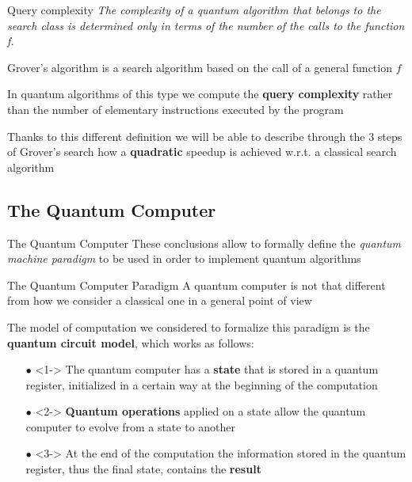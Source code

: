 		\begin{frame}{Query complexity}
			\small
			\emph{The complexity of a quantum algorithm that belongs to the search class is determined only in terms of the number of the calls to the function f.}
			
			\vspace{0.3cm}
			
			Grover's algorithm is a search algorithm based on the call of a general function $f$\\
			
			\vspace{0.2cm}
			
			In quantum algorithms of this type we compute the \textbf{query complexity} rather than the number of elementary instructions executed by the program \\
			
			\vspace{0.2cm}
			
			Thanks to this different definition we will be able to describe through the 3 steps of Grover's search how a \textbf{quadratic} speedup is achieved w.r.t. a classical search algorithm
		\end{frame}
	
	\subsection{The Quantum Computer}
		\begin{frame}{The Quantum Computer}
			\small
			These conclusions allow to formally define the \emph{quantum machine paradigm} to be used in order to implement quantum algorithms
		\end{frame}
	
		\begin{frame}{The Quantum Computer Paradigm}
			A quantum computer is not that different from how we consider a classical one in a general point of view\\
			
			\vspace{0.3cm}
			
			The model of computation we considered to formalize this paradigm is the \textbf{quantum circuit model}, which works as follows:
			\begin{itemize}
				\item[$\bullet$] <1-> The quantum computer has a \textbf{state} that is stored in a quantum register, initialized in a certain way at the beginning of the computation
				
				\item[$\bullet$] <2-> \textbf{Quantum operations} applied on a state allow the quantum computer to evolve from a state to another
				
				\item[$\bullet$] <3-> At the end of the computation the information stored in the quantum register, thus the final state, contains the \textbf{result}
			\end{itemize}
		\end{frame}
	
